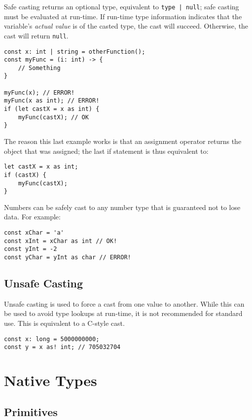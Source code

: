 \documentclass[12pt]{article}
\begin{document}
Safe casting returns an optional type, equivalent to \lstinline!type | null!; safe casting must be evaluated at run-time. If run-time type information indicates that the variable's \emph{actual value} is of the casted type, the cast will succeed. Otherwise, the cast will return \lstinline!null!.

\begin{lstlisting}
const x: int | string = otherFunction();
const myFunc = (i: int) -> {
	// Something
}

myFunc(x); // ERROR!
myFunc(x as int); // ERROR!
if (let castX = x as int) {
	myFunc(castX); // OK
}
\end{lstlisting}

The reason this last example works is that an assignment operator returns the object that was assigned; the last if statement is thus equivalent to:

\begin{lstlisting}
let castX = x as int;
if (castX) {
	myFunc(castX);
}
\end{lstlisting}

Numbers can be safely cast to any number type that is guaranteed not to lose data. For example:

\begin{lstlisting}
const xChar = 'a'
const xInt = xChar as int // OK!
const yInt = -2
const yChar = yInt as char // ERROR!
\end{lstlisting}

\subsection{Unsafe Casting}

Unsafe casting is used to force a cast from one value to another. While this can be used to avoid type lookups at run-time, it is not recommended for standard use. This is equivalent to a C-style cast.

\begin{lstlisting}
const x: long = 5000000000;
const y = x as! int; // 705032704
\end{lstlisting}

\section{Native Types}

\subsection{Primitives}
\end{document}
